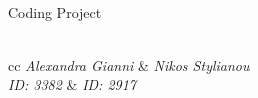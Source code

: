 \documentclass[a4paper,12pt]{article}
\begin{document}
\begin{titlepage}
		\HRule \\[0.5cm]
		{ \huge Coding Project}\\[0.4cm] %
		\HRule \\[1.8cm]
		
		
		
		\vspace*{1cm}
		\begin{minipage}{\textwidth}
			\centering
			\begin{tblr}{cc}
				 \emph{{\LARGE Alexandra Gianni}} & \emph{{\LARGE Nikos Stylianou}} \\ [3mm]
				 \emph{{\LARGE ID: 3382}} & \emph{{\LARGE ID: 2917}} \\
			\end{tblr}
		\end{minipage}\\[2.5cm]
		
		
		
		
		
	\end{titlepage}
	
	\tableofcontents
	\newpage
	
	
	
	
	
	
	
	\newpage
	\nocite{*}
	
	
	
\end{document}
